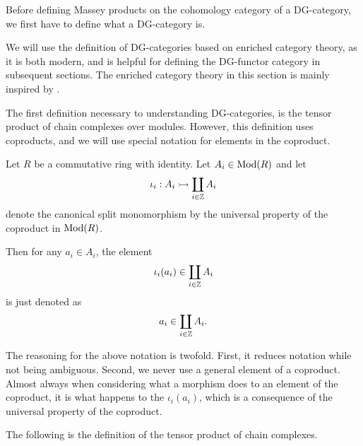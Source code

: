 Before defining Massey products on the cohomology category of a DG-category, we first have to define what a DG-category is.

We will use the definition of DG-categories based on enriched category theory, as it is both modern, and is helpful for defining the DG-functor category in subsequent sections. The enriched category theory in this section is mainly inspired by \cite[Section 6.2]{Borceux_1994}.

The first definition necessary to understanding DG-categories, is the tensor product of chain complexes over modules. However, this definition uses coproducts, and we will use special notation for elements in the coproduct.

\begin{notation}
    \label{not:coprod}
    Let \( R \) be a commutative ring with identity. Let \( A_i \in \operatorname{Mod}(R) \) and let
    \[
        \iota_i: A_i \rightarrowtail \coprod_{i \in {\mathbb{Z}}} A_i
    \]
    denote the canonical split monomorphism by the universal property of the coproduct in \( \operatorname{Mod}(R) \).

    Then for any \( a_i \in A_i \), the element
    \[
        \iota_i(a_i) \in \coprod_{i \in {\mathbb{Z}}} A_i
    \]
    is just denoted as
    \[
        a_i \in \coprod_{i \in {\mathbb{Z}}} A_i.
    \]
    
    
\end{notation}

The reasoning for the above notation is twofold. First, it reduces notation while not being ambiguous. Second, we never use a general element of a coproduct. Almost always when considering what a morphism does to an element of the coproduct, it is what happens to the \( \iota_i(a_i) \), which is a consequence of the universal property of the coproduct.

The following is the definition of the tensor product of chain complexes.

